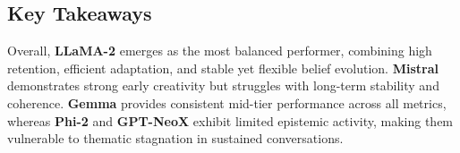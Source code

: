 \documentclass[11pt]{article}
\begin{document}
\subsection{Key Takeaways}
Overall, \textbf{LLaMA-2} emerges as the most balanced performer, combining high retention, efficient adaptation, and stable yet flexible belief evolution. \textbf{Mistral} demonstrates strong early creativity but struggles with long-term stability and coherence. \textbf{Gemma} provides consistent mid-tier performance across all metrics, whereas \textbf{Phi-2} and \textbf{GPT-NeoX} exhibit limited epistemic activity, making them vulnerable to thematic stagnation in sustained conversations.
\end{document}

